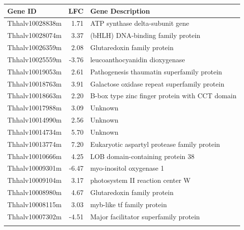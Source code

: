 \documentclass[12pt]{article}
\begin{document}
	\begin{table}[H]
		\centering

		\begin{tabular}{lrl}
			\toprule
			Gene ID & LFC & Gene Description \\
			\midrule
			\rowcolor{Gray}
			Thhalv10028838m & 1.71  & ATP synthase delta-subunit gene                          \\
			\rowcolor{Gray}
			Thhalv10028074m & 3.37   & (bHLH) DNA-binding family protein \\
			Thhalv10026359m & 2.08  & Glutaredoxin family protein                              \\
			\rowcolor{Gray}
			Thhalv10025559m & -3.76 & leucoanthocyanidin dioxygenase                           \\
			Thhalv10019053m & 2.61  & Pathogenesis thaumatin superfamily protein       \\
			\rowcolor{Gray}
			Thhalv10018763m & 3.91  & Galactose oxidase repeat superfamily protein       \\
			Thhalv10018663m & 2.20  & B-box type zinc finger protein with CCT domain           \\
			\rowcolor{Gray}
			Thhalv10017988m & 3.09  & Unknown                                                  \\
			Thhalv10014990m & 2.56  & Unknown                                                  \\
			\rowcolor{Gray}
			Thhalv10014734m & 5.70  & Unknown                                                  \\
			Thhalv10013774m & 7.20    & Eukaryotic aspartyl protease family protein              \\
			\rowcolor{Gray}
			Thhalv10010666m & 4.25  & LOB domain-containing protein 38                         \\
			Thhalv10009301m & -6.47  & myo-inositol oxygenase 1                                 \\
			\rowcolor{Gray}
			Thhalv10009104m & 3.17  & photosystem II reaction center W                         \\
			Thhalv10008980m & 4.67  & Glutaredoxin family protein                              \\
			\rowcolor{Gray}
			Thhalv10008115m & 3.03  & myb-like tf family protein             \\
			Thhalv10007302m & -4.51 & Major facilitator superfamily protein                    \\
			\rowcolor{Gray}

\end{tabular}
\end{table}
\end{document}
